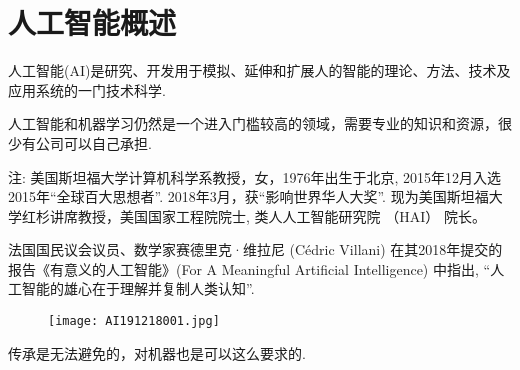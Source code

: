 \chapter{人工智能概述}
\begin{tcolorbox}[colback=white!50,colframe=orange!50,title=人工智能]
\begin{center}
   人工智能(AI)是研究、开发用于模拟、延伸和扩展人的智能的理论、方法、技术及应用系统的一门技术科学.\hfill
\end{center}
\end{tcolorbox}
\begin{tcolorbox}[colback=white!50, colframe=orange!50, title=李飞飞]
\begin{center}
   人工智能和机器学习仍然是一个进入门槛较高的领域，需要专业的知识和资源，很少有公司可以自己承担.\hfill
\end{center}
\end{tcolorbox}
注: 美国斯坦福大学计算机科学系教授，女，1976年出生于北京, 2015年12月入选2015年“全球百大思想者”. 2018年3月，获“影响世界华人大奖”.
现为美国斯坦福大学红杉讲席教授，美国国家工程院院士, 类人人工智能研究院 （HAI） 院长。

法国国民议会议员、数学家赛德里克·维拉尼 (Cédric Villani) 在其2018年提交的报告《有意义的人工智能》(For A Meaningful Artificial Intelligence) 中指出, “人工智能的雄心在于理解并复制人类认知”.
\begin{figure}[H]
\centering
\texttt{[image: AI191218001.jpg]}
\label{AI191218001}
\end{figure}
\begin{tcolorbox}[colback=white!50, colframe=orange!50, title=无名氏]
\begin{center}
   传承是无法避免的，对机器也是可以这么要求的.
\end{center}
\end{tcolorbox}

